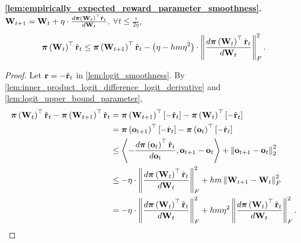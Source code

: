 {\bf \cref{lem:empirically_expected_reward_parameter_smoothness}.} ${\mathbf{W}}_{t+1} = {\mathbf{W}}_t + \eta \cdot \frac{d {\boldsymbol{\pi}}\left({\mathbf{W}}_t\right)^\top \hat{{\mathbf{r}}}_t}{d {\mathbf{W}}_t}$. $\forall t \le \frac{\tau}{ 2 \eta }$,
\begin{equation*}
\begin{split}
    {\boldsymbol{\pi}}\left( {\mathbf{W}}_t \right)^\top \hat{{\mathbf{r}}}_t \le {\boldsymbol{\pi}}\left( {\mathbf{W}}_{t+1} \right)^\top \hat{{\mathbf{r}}}_t - \left( \eta - h m \eta^2 \right) \cdot \left\| \frac{d {\boldsymbol{\pi}}\left( {\mathbf{W}}_t \right)^\top \hat{{\mathbf{r}}}_t}{d {\mathbf{W}}_t} \right\|_F^2.
\end{split}
\end{equation*}
\begin{proof}
   Let ${\mathbf{r}} = - \hat{{\mathbf{r}}}_t$ in \cref{lem:logit_smoothness}. By \cref{lem:inner_product_logit_difference_logit_derivative} and \cref{lem:logit_upper_bound_parameter},
\begin{equation*}
\begin{split}
    {\boldsymbol{\pi}}\left( {\mathbf{W}}_t \right)^\top \hat{{\mathbf{r}}}_t - {\boldsymbol{\pi}}\left( {\mathbf{W}}_{t+1} \right)^\top \hat{{\mathbf{r}}}_t &= {\boldsymbol{\pi}}\left( {\mathbf{W}}_{t+1} \right)^\top \left[ - \hat{{\mathbf{r}}}_t \right] - {\boldsymbol{\pi}}\left( {\mathbf{W}}_t \right)^\top \left[ - \hat{{\mathbf{r}}}_t \right]  \\
    &= {\boldsymbol{\pi}}\left( {\mathbf{o}}_{t+1} \right)^\top \left[ - \hat{{\mathbf{r}}}_t \right] - {\boldsymbol{\pi}}\left( {\mathbf{o}}_t \right)^\top \left[ - \hat{{\mathbf{r}}}_t \right] \\
    &\le \left\langle - \frac{d {\boldsymbol{\pi}}\left( {\mathbf{o}}_t \right)^\top \hat{{\mathbf{r}}}_t}{d {\mathbf{o}}_t}, {\mathbf{o}}_{t+1} - {\mathbf{o}}_t \right\rangle + \left\| {\mathbf{o}}_{t+1} - {\mathbf{o}}_t  \right\|_2^2 \\
    &\le - \eta \cdot \left\| \frac{d {\boldsymbol{\pi}}\left({\mathbf{W}}_t\right)^\top \hat{{\mathbf{r}}}_t}{d {\mathbf{W}}_t} \right\|_F^2 + h m \left\| {\mathbf{W}}_{t+1} - {\mathbf{W}}_t \right\|_F^2 \\
    &= - \eta \cdot \left\| \frac{d {\boldsymbol{\pi}}\left({\mathbf{W}}_t\right)^\top \hat{{\mathbf{r}}}_t}{d {\mathbf{W}}_t} \right\|_F^2 + h m \eta^2 \left\| \frac{d {\boldsymbol{\pi}}\left({\mathbf{W}}_t\right)^\top \hat{{\mathbf{r}}}_t}{d {\mathbf{W}}_t} \right\|_F^2. \qedhere
\end{split}
\end{equation*}
\end{proof}

